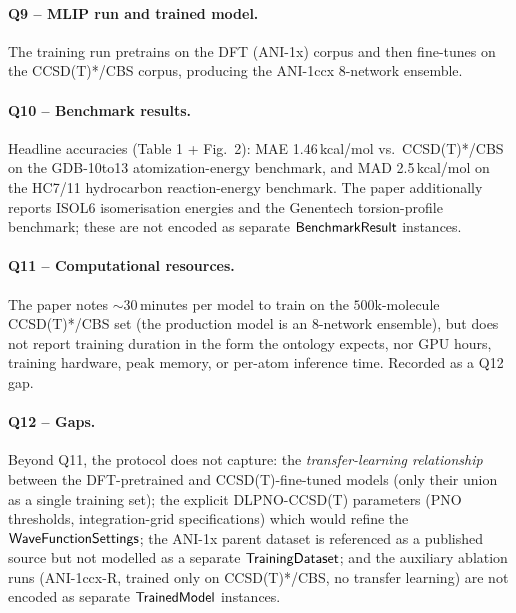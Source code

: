 \paragraph{Q9 -- MLIP run and trained model.}
The training run pretrains on the DFT (ANI-1x) corpus and then
fine-tunes on the CCSD(T)*/CBS corpus, producing the ANI-1ccx
8-network ensemble.


\paragraph{Q10 -- Benchmark results.}
Headline accuracies (Table 1 + Fig.\ 2): MAE 1.46\,kcal/mol vs.\
CCSD(T)*/CBS on the GDB-10to13 atomization-energy benchmark, and
MAD 2.5\,kcal/mol on the HC7/11 hydrocarbon reaction-energy
benchmark. The paper additionally reports ISOL6 isomerisation
energies and the Genentech torsion-profile benchmark; these are not
encoded as separate $\mathsf{BenchmarkResult}$ instances.


\paragraph{Q11 -- Computational resources.}
The paper notes ${\sim}30$\,minutes per model to train on the
$500$k-molecule CCSD(T)*/CBS set (the production model is an
8-network ensemble), but does not report training duration in the
form the ontology expects, nor GPU hours, training hardware, peak
memory, or per-atom inference time. Recorded as a Q12 gap.


\paragraph{Q12 -- Gaps.}
Beyond Q11, the protocol does not capture: the
\emph{transfer-learning relationship} between the DFT-pretrained and
CCSD(T)-fine-tuned models (only their union as a single training
set); the explicit DLPNO-CCSD(T) parameters (PNO thresholds,
integration-grid specifications) which would refine the
$\mathsf{WaveFunctionSettings}$; the ANI-1x parent dataset is
referenced as a published source but not modelled as a separate
$\mathsf{TrainingDataset}$; and the auxiliary ablation runs
(ANI-1ccx-R, trained only on CCSD(T)*/CBS, no transfer learning)
are not encoded as separate $\mathsf{TrainedModel}$ instances.
